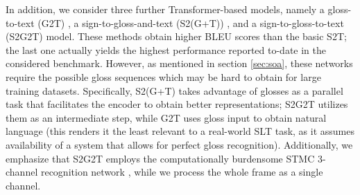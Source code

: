 \documentclass[10pt,twocolumn,letterpaper]{article}
\begin{document}
In addition, we consider three further Transformer-based models, namely  a gloss-to-text (G2T) \cite{Camgoz20}, a sign-to-gloss-and-text (S2(G+T)) \cite{Camgoz20}, and a sign-to-gloss-to-text (S2G2T) \cite{yin2020} model. These methods obtain higher BLEU scores than the basic S2T; the last one actually yields the highest performance reported to-date in the considered benchmark. However, as mentioned in section \ref{sec:soa}, these networks require the possible gloss sequences which may be hard to obtain for large training datasets. Specifically, S2(G+T) takes advantage of glosses as a parallel task that facilitates the encoder to obtain better representations; S2G2T utilizes them as an intermediate step, while G2T uses gloss input to obtain natural language (this renders it the least relevant to a real-world SLT task, as it assumes availability of a system that allows for perfect gloss recognition). Additionally, we emphasize that S2G2T employs the computationally burdensome STMC 3-channel recognition network \cite{ZhouZZL20}, while we process the whole frame as a single channel.
\end{document}
